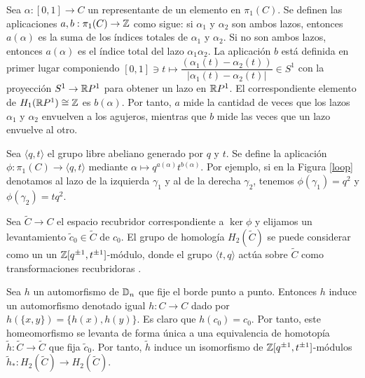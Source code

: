 \documentclass[TFG.tex]{subfiles}
\begin{document}
Sea $\alpha:[0,1]\to C$ un representante de un elemento en $\pi_1(C)$. Se definen las aplicaciones $a,b:\pi_1(C)\to\mathbb{Z}$ como sigue: si $\alpha_1$ y $\alpha_2$ son ambos lazos, entonces $a(\alpha)$ es la suma de los índices totales de $\alpha_1$ y $\alpha_2$. Si no son ambos lazos, entonces $a(\alpha)$ es el índice total del lazo $\alpha_1\alpha_2$. La aplicación $b$ está definida en primer lugar componiendo $[0,1]\ni t\mapsto \dfrac{(\alpha_1(t)-\alpha_2(t))}{|\alpha_1(t)-\alpha_2(t)|}\in S^1$ con la proyección $S^1\to \mathbb{R} P^1$ para obtener un lazo en $\mathbb{R} P^1$. El correspondiente elemento de $H_1(\mathbb{R} P^1)\cong\mathbb{Z}$ es $b(\alpha)$. Por tanto, $a$ mide la cantidad de veces que los lazos $\alpha_1$ y $\alpha_2$ envuelven a los agujeros, mientras que $b$ mide las veces que un lazo envuelve al otro.



Sea $\langle q,t\rangle$ el grupo libre abeliano  generado por $q$ y $t$. Se define la aplicación $\phi:\pi_1(C)\to\langle q,t\rangle$ mediante $\alpha\mapsto q^{a(\alpha)}t^{b(\alpha)}$. Por ejemplo, si en la Figura \ref{loop} denotamos al lazo de la izquierda $\gamma_1$ y al de la derecha $\gamma_2$, tenemos $\phi(\gamma_1)=q^2$ y $\phi(\gamma_2)=tq^2$. 

Sea $\widetilde{C}\to C$ el espacio recubridor correspondiente a $\ker\phi$ y elijamos un levantamiento $\tilde{c}_0\in\widetilde{C}$ de $c_0$. El grupo de homología $H_2(\widetilde{C})$ se puede considerar como un un $\mathbb{Z}[q^{\pm 1},t^{\pm 1}]$-módulo, donde el grupo $\langle t,q\rangle$ actúa sobre $\widetilde{C}$ como transformaciones recubridoras \cite{Bigelow}.

Sea $h$ un automorfismo de $\mathbb{D}_n$ que fije el borde punto a punto. Entonces $h$ induce un automorfismo denotado igual $h:C\to C$ dado por $h(\{x,y\})=\{h(x),h(y)\}$. Es claro que $h(c_0)=c_0$. Por tanto, este homeomorfismo se levanta de forma única a una equivalencia de homotopía $\tilde{h}:\widetilde{C}\to\widetilde{C}$ que fija $\tilde{c}_0$. Por tanto, $\tilde{h}$ induce un isomorfismo de $\mathbb{Z}[q^{\pm 1},t^{\pm 1}]$-módulos $\tilde{h}_*:H_2(\widetilde{C})\to H_2(\widetilde{C})$.
\end{document}
